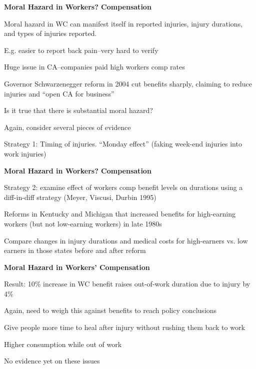 \documentclass[landscape]{slides}
\begin{document}
\begin{slide}
\begin{center}
{\bf Moral Hazard in Workers? Compensation}
\end{center}
Moral hazard in WC can manifest itself in reported injuries, injury durations, and types of injuries reported.

E.g. easier to report back pain--very hard to verify

Huge issue in CA--companies paid high workers comp rates

Governor Schwarzenegger reform in 2004 cut benefits sharply, claiming to reduce injuries and ``open CA for business''

Is it true that there is substantial moral hazard?

Again, consider several pieces of evidence

Strategy 1: Timing of injuries. ``Monday effect'' (faking week-end injuries into
work injuries)

\end{slide}

\begin{slide}

\end{slide}


\begin{slide}
\begin{center}
{\bf Moral Hazard in Workers? Compensation}
\end{center}
Strategy 2: examine effect of workers comp benefit levels on durations using a diff-in-diff strategy (Meyer, Viscusi, Durbin 1995)

Reforms in Kentucky and Michigan that increased benefits for high-earning workers (but not low-earning workers) in late 1980s

Compare changes in injury durations and medical costs for high-earners vs. low earners in those states before and after reform


\end{slide}

\begin{slide}

\end{slide}

\begin{slide}

\end{slide}


\begin{slide}
\begin{center}
{\bf Moral Hazard in Workers' Compensation}
\end{center}
Result: 10\% increase in WC benefit raises out-of-work duration due to injury by 4\%

Again, need to weigh this against benefits to reach policy conclusions

Give people more time to heal after injury without rushing them back to work

Higher consumption while out of work

No evidence yet on these issues


\end{slide}
\end{document}
